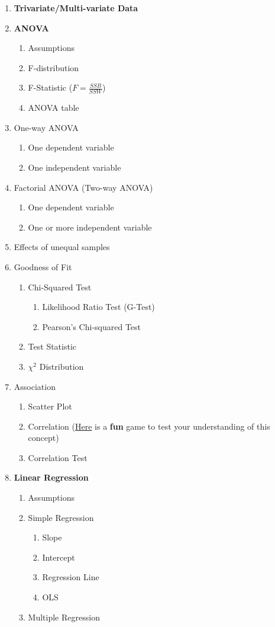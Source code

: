 \documentclass[11pt]{article}
\begin{document}
\begin{enumerate}
\item \textbf{Trivariate/Multi-variate Data}
\item \textbf{ANOVA}
\begin{enumerate}
	\item Assumptions
	\item F-distribution
	\item F-Statistic ($F = \frac{SSB}{SSW}$)
	\item ANOVA table
\end{enumerate}
\item One-way ANOVA
\begin{enumerate}
	\item One dependent variable
	\item One independent variable
\end{enumerate}
\item Factorial ANOVA (Two-way ANOVA)
\begin{enumerate}
	\item One dependent variable
	\item One or more independent variable
\end{enumerate}
\item Effects of unequal samples
\item Goodness of Fit
\begin{enumerate}
	\item Chi-Squared Test
	\begin{enumerate}
		\item Likelihood Ratio Test (G-Test)
		\item Pearson's Chi-squared Test
	\end{enumerate}
    \item Test Statistic
    \item $\chi^2$ Distribution
\end{enumerate}
\item Association
\begin{enumerate}
	\item Scatter Plot
	\item Correlation (\href{http://guessthecorrelation.com/}{Here} is a \textbf{fun} game to test your understanding of this concept)
	\item Correlation Test
\end{enumerate}
\item \textbf{Linear Regression}
\begin{enumerate}
	\item Assumptions
	\item Simple Regression
	\begin{enumerate}
		\item Slope
		\item Intercept
		\item Regression Line
		\item OLS
	\end{enumerate}
	\item Multiple Regression
\end{enumerate}
\end{enumerate}
\end{document}

